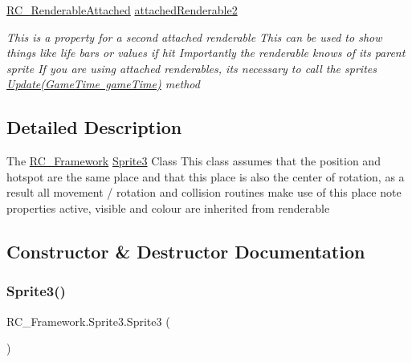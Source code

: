 \begin{DoxyCompactItemize}
\mbox{\hyperlink{class_r_c___framework_1_1_r_c___renderable_attached}{R\+C\+\_\+\+Renderable\+Attached}} \mbox{\hyperlink{class_r_c___framework_1_1_sprite3_ae627737dc486e6c5a9255921e620ff26}{attached\+Renderable2}}
\begin{DoxyCompactList}\small\item\em This is a property for a second attached renderable This can be used to show things like life bars or values if hit Importantly the renderable knows of its parent sprite If you are using attached renderables, its necessary to call the sprites \mbox{\hyperlink{class_r_c___framework_1_1_sprite3_a5473d37c4f1f44fa1685dd64c82dfd8c}{Update(\+Game\+Time game\+Time)}} method \end{DoxyCompactList}\end{DoxyCompactItemize}


\subsection{Detailed Description}
The \mbox{\hyperlink{namespace_r_c___framework}{R\+C\+\_\+\+Framework}} \mbox{\hyperlink{class_r_c___framework_1_1_sprite3}{Sprite3}} Class This class assumes that the position and hotspot are the same place and that this place is also the center of rotation, as a result all movement / rotation and collision routines make use of this place note properties active, visible and colour are inherited from renderable 



\subsection{Constructor \& Destructor Documentation}
\mbox{\label{class_r_c___framework_1_1_sprite3_a92d70269202bf98ede05cbc45ca3690a}} 
\subsubsection{\texorpdfstring{Sprite3()}{Sprite3()}\hspace{0.1cm}{\footnotesize\ttfamily [1/3]}}
{\footnotesize\ttfamily R\+C\+\_\+\+Framework.\+Sprite3.\+Sprite3 (\begin{DoxyParamCaption}{ }\end{DoxyParamCaption})}



